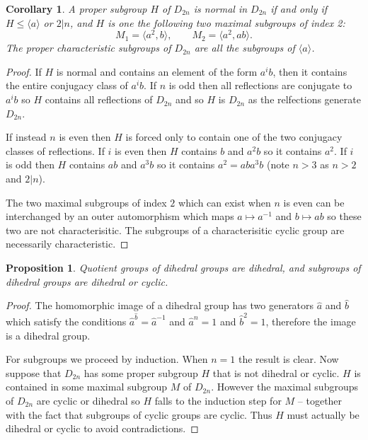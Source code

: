 \documentclass[12pt]{article}
\newtheorem{coro}[thm]{Corollary}
\newtheorem{prop}[thm]{Proposition}
\begin{document}
\begin{coro}
A proper subgroup $H$ of $D_{2n}$ is normal in $D_{2n}$ if and only if $H\leq \langle a\rangle$ or $2|n$, and $H$ is one the following two maximal subgroups
of index 2:
\[M_1=\langle a^2,b\rangle,\qquad M_2=\langle a^2,ab\rangle.\]
The proper characteristic subgroups of $D_{2n}$ are all the subgroups of $\langle a\rangle$.
\end{coro}
\begin{proof}
If $H$ is normal and contains an element of the form $a^i b$, then it contains 
the entire conjugacy class of $a^i b$.  If $n$ is odd then all reflections are
conjugate to $a^ib$ so $H$ contains all reflections of $D_{2n}$ and so $H$ is $D_{2n}$ as the relfections generate $D_{2n}$.

If instead $n$ is even then $H$ is forced only to contain one of the two conjugacy classes of reflections.  If $i$ is even then $H$ contains $b$ and $a^2b$ so it contains $a^2$.  If $i$ is odd then $H$ contains $ab$ and $a^3b$
so it contains $a^2=aba^3b$ (note $n>3$ as $n>2$ and $2|n$).

The two maximal subgroups of index $2$ which can exist when $n$ is even can be interchanged by an outer automorphism which maps $a\mapsto a^{-1}$ and 
$b\mapsto ab$ so these two are not characterisitic.  The subgroups of a characterisitic cyclic group are necessarily characteristic.
\end{proof}

\begin{prop}
Quotient groups of dihedral groups are dihedral, and subgroups of dihedral
groups are dihedral or cyclic.
\end{prop}

\begin{proof}
The homomorphic image of a dihedral group has two generators $\hat a$
and $\hat b$ which satisfy the conditions $\hat a^{\hat b}=\hat a^{-1}$
and $\hat a^n=1$ and $\hat b^2=1$, therefore the image is a dihedral group.

For subgroups we proceed by induction.  When $n=1$ the result is clear.
Now suppose that $D_{2n}$ has some proper subgroup $H$ that is not dihedral
or cyclic.  $H$ is contained in some maximal subgroup $M$ of $D_{2n}$.  However
the maximal subgroups of $D_{2n}$ are cyclic or dihedral so $H$ falls to 
the induction step for $M$ -- together with the fact that subgroups of
cyclic groups are cyclic.  Thus $H$ must actually be dihedral or cyclic
to avoid contradictions.
\end{proof}
\end{document}
